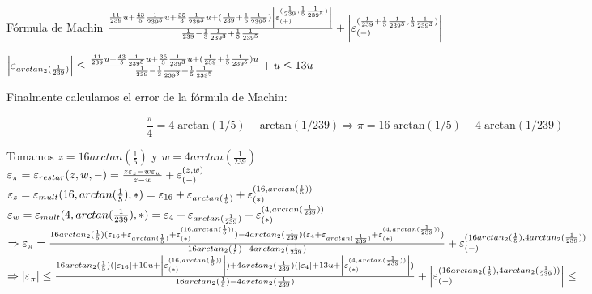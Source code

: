 \begin{subsection}{Fórmula de Machin}
	$\frac{\frac{11}{239}u + \frac{43}{5}\frac{1}{239^5}u + \frac{35}{3}\frac{1}{239^3}u + (\frac{1}{239}+\frac{1}{5}\frac{1}{239^5})\left|\varepsilon _{({+})}^{({\frac{1}{239},\frac{1}{5}\frac{1}{239^5}})}\right|}{\frac{1}{239}-\frac{1}{3}\frac{1}{239^3}+\frac{1}{5}\frac{1}{239^5}} + \left|\varepsilon _{({-})}^{({\frac{1}{239}+\frac{1}{5}\frac{1}{239^5},\frac{1}{3}\frac{1}{239^3}})}\right|$\\
	
	\pa
	
	$\left|\varepsilon _{arctan_2(\frac{1}{239})}\right| \leq \frac{\frac{11}{239}u + \frac{43}{5}\frac{1}{239^5}u + \frac{35}{3}\frac{1}{239^3}u + (\frac{1}{239}+\frac{1}{5}\frac{1}{239^5})u}{\frac{1}{239}-\frac{1}{3}\frac{1}{239^3}+\frac{1}{5}\frac{1}{239^5}} + u \leq 13u$\\
	
	\pa
	
	Finalmente calculamos el error de la fórmula de Machin:
	
	\begin{equation*}
		\frac{\pi}{4} = 4 \; \mathrm{arctan}(1/5) - \mathrm{arctan}(1/239) \Rightarrow \pi = 16 \; \mathrm{arctan}(1/5) - 4 \; \mathrm{arctan}(1/239)
    \end{equation*}
	
	Tomamos $z=16arctan(\frac{1}{5})$ y $w=4arctan(\frac{1}{239})$\\
	
	$\varepsilon _{\pi} = \varepsilon _{restar}({z,w,-}) = \frac{z\varepsilon _{z} - w\varepsilon _{w}}{z-w} + \varepsilon _{({-})}^{({z,w})}$\\
	
	$\varepsilon _{z} = \varepsilon _{mult}({16,arctan(\frac{1}{5}),*}) = \varepsilon _{16} + \varepsilon _{arctan(\frac{1}{5})} + \varepsilon _{({*})}^{({16,arctan(\frac{1}{5})})}$\\
	
	$\varepsilon _{w} = \varepsilon _{mult}({4,arctan(\frac{1}{239}),*}) = \varepsilon _{4} + \varepsilon _{arctan(\frac{1}{239})} + \varepsilon _{({*})}^{({4,arctan(\frac{1}{239})})}$\\
	
	$\Rightarrow \varepsilon _{\pi} = \frac{16arctan_2(\frac{1}{5})(\varepsilon _{16} + \varepsilon _{arctan(\frac{1}{5})} + \varepsilon _{({*})}^{({16,arctan(\frac{1}{5})})}) - 4arctan_2(\frac{1}{239})(\varepsilon _{4} + \varepsilon _{arctan(\frac{1}{239})} + \varepsilon _{({*})}^{({4,arctan(\frac{1}{239})})})}{16arctan_2(\frac{1}{5})-4arctan_2(\frac{1}{239})} + \varepsilon _{({-})}^{({16arctan_2(\frac{1}{5}),4arctan_2(\frac{1}{239})})}$\\
	
	$\Rightarrow \left|\varepsilon _{\pi}\right| \leq \frac{16arctan_2(\frac{1}{5})(|\varepsilon _{16}| + 10u + \left|\varepsilon _{({*})}^{({16,arctan(\frac{1}{5})})}\right|) + 4arctan_2(\frac{1}{239})(|\varepsilon _{4}| + 13u + \left|\varepsilon _{({*})}^{({4,arctan(\frac{1}{239})})}\right|)}{16arctan_2(\frac{1}{5})-4arctan_2(\frac{1}{239})} + \left|\varepsilon _{({-})}^{({16arctan_2(\frac{1}{5}),4arctan_2(\frac{1}{239})})}\right| \leq$\\
	

\end{subsection}

